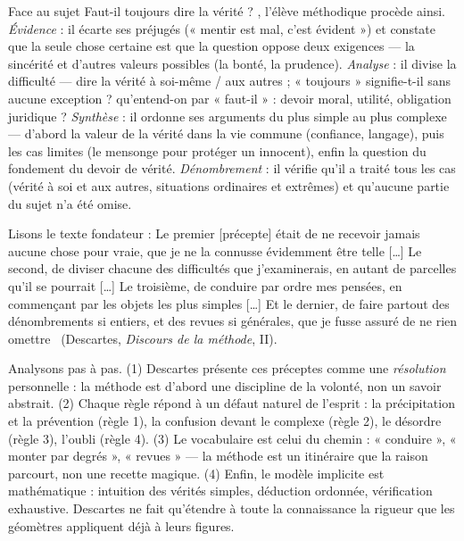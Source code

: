 \documentclass[11pt]{article}
\begin{document}
\begin{exemplebox}
Face au sujet \guillemotleft Faut-il toujours dire la vérité ? \guillemotright, l'élève méthodique procède ainsi. \emph{Évidence} : il écarte ses préjugés (« mentir est mal, c'est évident ») et constate que la seule chose certaine est que la question oppose deux exigences — la sincérité et d'autres valeurs possibles (la bonté, la prudence). \emph{Analyse} : il divise la difficulté — dire la vérité à soi-même / aux autres ; « toujours » signifie-t-il sans aucune exception ? qu'entend-on par « faut-il » : devoir moral, utilité, obligation juridique ? \emph{Synthèse} : il ordonne ses arguments du plus simple au plus complexe — d'abord la valeur de la vérité dans la vie commune (confiance, langage), puis les cas limites (le mensonge pour protéger un innocent), enfin la question du fondement du devoir de vérité. \emph{Dénombrement} : il vérifie qu'il a traité tous les cas (vérité à soi et aux autres, situations ordinaires et extrêmes) et qu'aucune partie du sujet n'a été omise.
\end{exemplebox}

\begin{experience}
Lisons le texte fondateur : \guillemotleft Le premier [précepte] était de ne recevoir jamais aucune chose pour vraie, que je ne la connusse évidemment être telle [\dots] Le second, de diviser chacune des difficultés que j'examinerais, en autant de parcelles qu'il se pourrait [\dots] Le troisième, de conduire par ordre mes pensées, en commençant par les objets les plus simples [\dots] Et le dernier, de faire partout des dénombrements si entiers, et des revues si générales, que je fusse assuré de ne rien omettre \guillemotright\ (Descartes, \emph{Discours de la méthode}, II).
\par
Analysons pas à pas. (1) Descartes présente ces préceptes comme une \emph{résolution} personnelle : la méthode est d'abord une discipline de la volonté, non un savoir abstrait. (2) Chaque règle répond à un défaut naturel de l'esprit : la précipitation et la prévention (règle 1), la confusion devant le complexe (règle 2), le désordre (règle 3), l'oubli (règle 4). (3) Le vocabulaire est celui du chemin : « conduire », « monter par degrés », « revues » — la méthode est un itinéraire que la raison parcourt, non une recette magique. (4) Enfin, le modèle implicite est mathématique : intuition des vérités simples, déduction ordonnée, vérification exhaustive. Descartes ne fait qu'étendre à toute la connaissance la rigueur que les géomètres appliquent déjà à leurs figures.
\end{experience}
\end{document}
